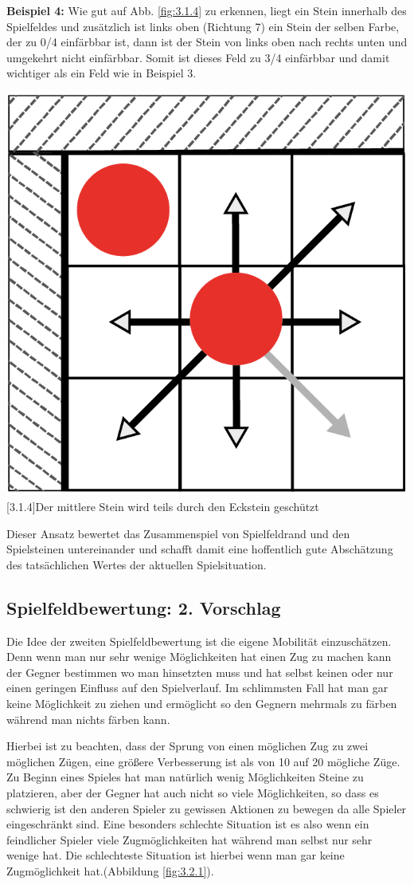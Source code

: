 \documentclass[12pt,a4paper,bibliography=totocnumbered,listof=totocnumbered]{scrartcl}
\begin{document}
    \textbf{Beispiel 4:} Wie gut auf Abb. \ref{fig:3.1.4} zu erkennen, liegt ein Stein innerhalb des Spielfeldes und zusätzlich ist links oben (Richtung 7) ein Stein der selben Farbe, der zu 0/4 einfärbbar ist, dann ist der Stein von links oben nach rechts unten und umgekehrt nicht einfärbbar. Somit ist dieses Feld zu 3/4 einfärbbar und damit wichtiger als ein Feld wie in Beispiel 3.\newline

   	\vspace{1em}
    \begin{minipage}{\linewidth}
    	\centering
    	\includegraphics[width=0.30\linewidth]{pics/Kapitel_3/Kapitel_3_pic4.png}
    	[3.1.4]{Der mittlere Stein wird teils durch den Eckstein geschützt}
    	\label{fig:3.1.4}
    \end{minipage}
	\vspace{1em}
	
	Dieser Ansatz bewertet das Zusammenspiel von Spielfeldrand und den Spielsteinen untereinander und schafft damit eine hoffentlich gute Abschätzung des tatsächlichen Wertes der aktuellen Spielsituation.

    \subsection{Spielfeldbewertung: 2. Vorschlag}
     \vspace{1em}
     
    Die Idee der zweiten Spielfeldbewertung ist die eigene Mobilität einzuschätzen. Denn wenn man nur sehr wenige Möglichkeiten hat einen Zug zu machen kann der Gegner bestimmen wo man hinsetzten muss und hat selbst keinen oder nur einen geringen Einfluss auf den Spielverlauf. Im schlimmsten Fall hat man gar keine Möglichkeit zu ziehen und ermöglicht so den Gegnern mehrmals zu färben während man nichts färben kann.
        
    Hierbei ist zu beachten, dass der Sprung von einen möglichen Zug zu zwei möglichen Zügen, eine größere Verbesserung ist als von 10 auf 20 mögliche Züge.
    Zu Beginn eines Spieles hat man natürlich wenig Möglichkeiten Steine zu platzieren, aber der Gegner hat auch nicht so viele Möglichkeiten, so dass es schwierig ist den anderen Spieler zu gewissen Aktionen zu bewegen da alle Spieler eingeschränkt sind. Eine besonders schlechte Situation ist es also wenn ein feindlicher Spieler viele Zugmöglichkeiten hat während man selbst nur sehr wenige hat.
    Die schlechteste Situation ist hierbei wenn man gar keine Zugmöglichkeit hat.(Abbildung \ref{fig:3.2.1}).
    
\end{document}

